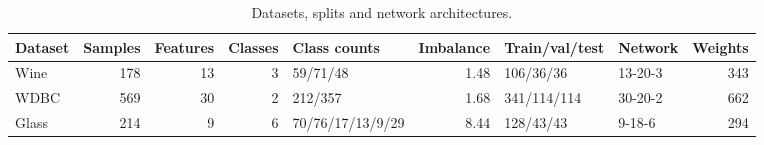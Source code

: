 \begin{table}
\caption{Datasets, splits and network architectures.}
\label{tab:datasets}
\begin{tabular}{lrrrlrllr}
\toprule
Dataset & Samples & Features & Classes & Class counts & Imbalance & Train/val/test & Network & Weights \\
\midrule
Wine & 178 & 13 & 3 & 59/71/48 & 1.48 & 106/36/36 & 13-20-3 & 343 \\
WDBC & 569 & 30 & 2 & 212/357 & 1.68 & 341/114/114 & 30-20-2 & 662 \\
Glass & 214 & 9 & 6 & 70/76/17/13/9/29 & 8.44 & 128/43/43 & 9-18-6 & 294 \\
\bottomrule
\end{tabular}
\end{table}
